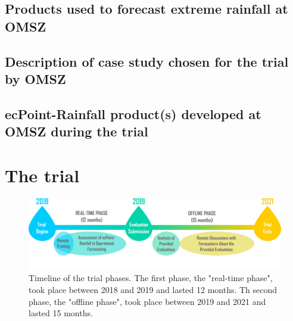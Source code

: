 \documentclass[twocol]{ametsocV5} %
\begin{document}
\subsection{Products used to forecast extreme rainfall at OMSZ}

\subsection{Description of case study chosen for the trial by OMSZ}

\subsection{ecPoint-Rainfall product(s) developed at OMSZ during the trial}



\section{The trial} 

\begin{figure}
\centerline{\includegraphics[width=39pc]{manuscript/Figures/Fig4.png}}
\caption{Timeline of the trial phases. The first phase, the "real-time phase", took place between 2018 and 2019 and lasted 12 months. Th second phase, the "offline phase", took place between 2019 and 2021 and lasted 15 months.}
\label{Fig4}
\end{figure}
\end{document}
